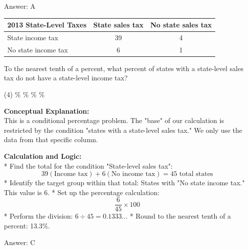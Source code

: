 \documentclass[11pt,paper=a4,answers]{exam}
\begin{document}
\begin{questions}
\begin{solution}
\vspace{30pt}

Answer: \colorbox{yellow!100}{A}
\end{solution}

\vspace{60pt}

\question
\begin{center}
\begin{tabular}{|l|c|c|}
\hline
\textbf{2013 State-Level Taxes} & \textbf{State sales tax} & \textbf{No state sales tax} \\ \hline
State income tax & 39 & 4 \\ \hline
No state income tax & 6 & 1 \\ \hline
\end{tabular}
\end{center}
To the nearest tenth of a percent, what percent of states with a state-level sales tax do not have a state-level income tax?
\begin{tasks}(4)
    \%
    \%
    \%
    \%
\end{tasks}

\begin{solution}
\textbf{Conceptual Explanation:} \\
This is a conditional percentage problem. The "base" of our calculation is restricted by the condition "states with a state-level sales tax." We only use the data from that specific column.

\vspace{30pt}

\textbf{Calculation and Logic:} \\
* Find the total for the condition "State-level sales tax":
\[ 39 (\text{Income tax}) + 6 (\text{No income tax}) = 45 \text{ total states} \]
* Identify the target group within that total: States with "No state income tax." This value is 6.
* Set up the percentage calculation:
\[ \frac{6}{45} \times 100 \]
* Perform the division: $6 \div 45 = 0.1333...$
* Round to the nearest tenth of a percent: 13.3\%.

\vspace{30pt}

Answer: \colorbox{yellow!100}{C}
\end{solution}

\vspace{60pt}


\end{questions}
\end{document}
